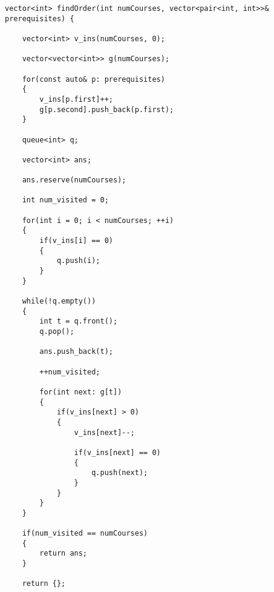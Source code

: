 \begin{lstlisting}[style=customc, caption={BFS}]
vector<int> findOrder(int numCourses, vector<pair<int, int>>& prerequisites) {

    vector<int> v_ins(numCourses, 0);

    vector<vector<int>> g(numCourses);

    for(const auto& p: prerequisites)
    {
        v_ins[p.first]++;
        g[p.second].push_back(p.first);
    }

    queue<int> q;

    vector<int> ans;

    ans.reserve(numCourses);

    int num_visited = 0;

    for(int i = 0; i < numCourses; ++i)
    {
        if(v_ins[i] == 0)
        {
            q.push(i);
        }
    }

    while(!q.empty())
    {
        int t = q.front();
        q.pop();

        ans.push_back(t);

        ++num_visited;

        for(int next: g[t])
        {
            if(v_ins[next] > 0)
            {
                v_ins[next]--;

                if(v_ins[next] == 0)
                {
                    q.push(next);
                }
            }
        }
    }

    if(num_visited == numCourses)
    {
        return ans;
    }

    return {};
\end{lstlisting}